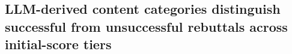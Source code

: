 \documentclass{article}
\begin{document}
\subsection{LLM-derived content categories distinguish successful from unsuccessful rebuttals across initial-score tiers}\label{res:rebuttal-categories}
\end{document}
